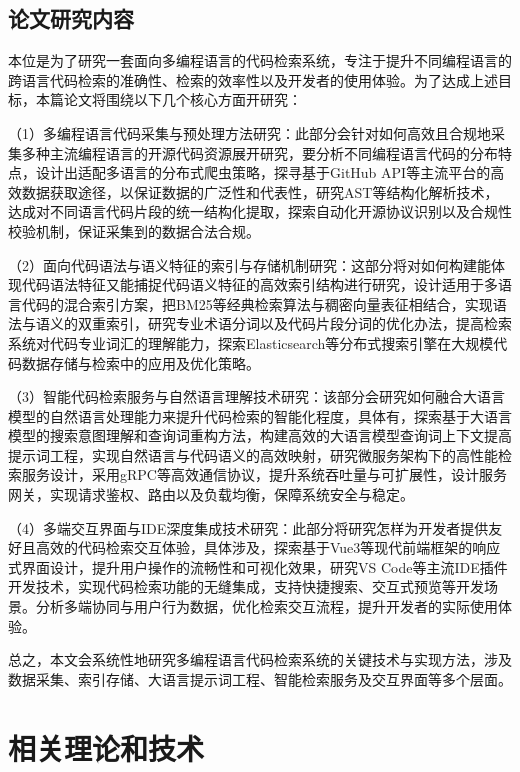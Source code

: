 \documentclass[UTF8,a4paper,12pt]{ctexart}
\numberwithin{equation}{section}
\begin{document}
\subsection{论文研究内容}
本位是为了研究一套面向多编程语言的代码检索系统，专注于提升不同编程语言的跨语言代码检索的准确性、检索的效率性以及开发者的使用体验。为了达成上述目标，本篇论文将围绕以下几个核心方面开研究：\par
（1）多编程语言代码采集与预处理方法研究：此部分会针对如何高效且合规地采集多种主流编程语言的开源代码资源展开研究，要分析不同编程语言代码的分布特点，设计出适配多语言的分布式爬虫策略，探寻基于GitHub API等主流平台的高效数据获取途径，以保证数据的广泛性和代表性，研究AST等结构化解析技术，达成对不同语言代码片段的统一结构化提取，探索自动化开源协议识别以及合规性校验机制，保证采集到的数据合法合规。\par
（2）面向代码语法与语义特征的索引与存储机制研究：这部分将对如何构建能体现代码语法特征又能捕捉代码语义特征的高效索引结构进行研究，设计适用于多语言代码的混合索引方案，把BM25等经典检索算法与稠密向量表征相结合，实现语法与语义的双重索引，研究专业术语分词以及代码片段分词的优化办法，提高检索系统对代码专业词汇的理解能力，探索Elasticsearch等分布式搜索引擎在大规模代码数据存储与检索中的应用及优化策略。\par
（3）智能代码检索服务与自然语言理解技术研究：该部分会研究如何融合大语言模型的自然语言处理能力来提升代码检索的智能化程度，具体有，探索基于大语言模型的搜索意图理解和查询词重构方法，构建高效的大语言模型查询词上下文提高提示词工程，实现自然语言与代码语义的高效映射，研究微服务架构下的高性能检索服务设计，采用gRPC等高效通信协议，提升系统吞吐量与可扩展性，设计服务网关，实现请求鉴权、路由以及负载均衡，保障系统安全与稳定。\par
（4）多端交互界面与IDE深度集成技术研究：此部分将研究怎样为开发者提供友好且高效的代码检索交互体验，具体涉及，探索基于Vue3等现代前端框架的响应式界面设计，提升用户操作的流畅性和可视化效果，研究VS Code等主流IDE插件开发技术，实现代码检索功能的无缝集成，支持快捷搜索、交互式预览等开发场景。分析多端协同与用户行为数据，优化检索交互流程，提升开发者的实际使用体验。\par
总之，本文会系统性地研究多编程语言代码检索系统的关键技术与实现方法，涉及数据采集、索引存储、大语言提示词工程、智能检索服务及交互界面等多个层面。\par


\newpage
{}

\section{相关理论和技术}
\end{document}
